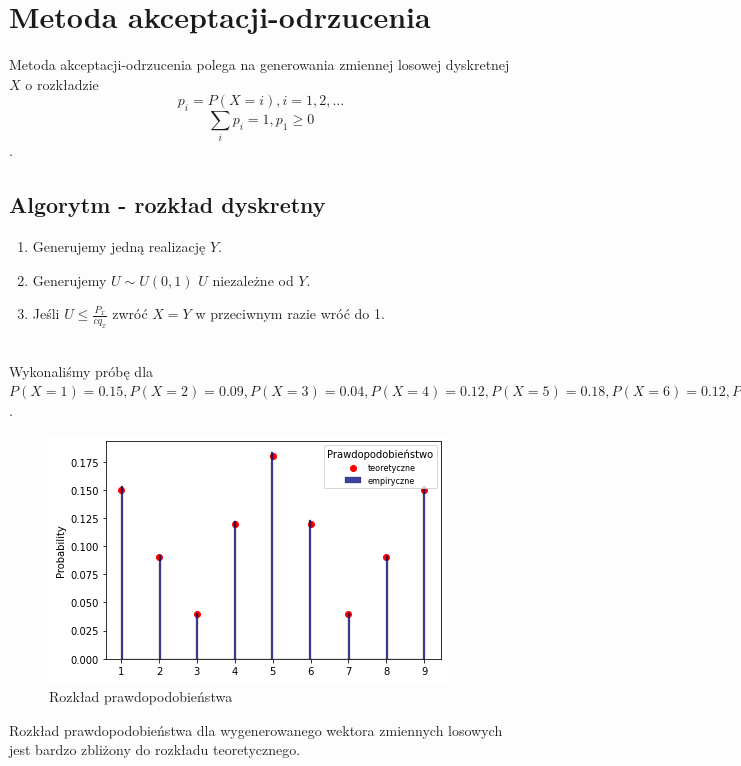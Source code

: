 \documentclass[12pt]{mwart}
\begin{document}
 

	\section{Metoda akceptacji-odrzucenia}
	\noindent Metoda akceptacji-odrzucenia polega na generowania zmiennej losowej dyskretnej $X$ o rozkładzie
	$$p_i = P(X=i), i= 1,2, \ldots$$
	$$ \sum_{i} p_i = 1, p_1 \geqslant 0 $$.
	
	\subsection{Algorytm - rozkład dyskretny}
	\begin{enumerate}
	
	\item Generujemy jedną realizację $Y$.
	\item Generujemy $U \sim U(0,1)$ $U$ niezależne od $Y$.
	\item Jeśli $U \leqslant \frac{P_x}{cq_x}$ zwróć $X=Y$ w przeciwnym razie wróć do 1. \\ \\		
\end{enumerate}

\noindent Wykonaliśmy próbę dla $ P(X=1)=0.15, P(X=2) = 0.09, P(X=3)=0.04, P(X=4)=0.12, P(X=5)=0.18, P(X=6)=0.12, P(X=7)=0.04, P(X=8)=0.09, P(X=9) = 0,15$.
	
	\begin{figure}[H]
		\begin{center}
			\includegraphics[scale=0.7]{ao1.png}
			\caption{Rozkład prawdopodobieństwa}
		\end{center}
	\end{figure}
	
	\noindent Rozkład prawdopodobieństwa dla wygenerowanego wektora zmiennych losowych jest bardzo zbliżony do rozkładu teoretycznego.
	
\end{document}
